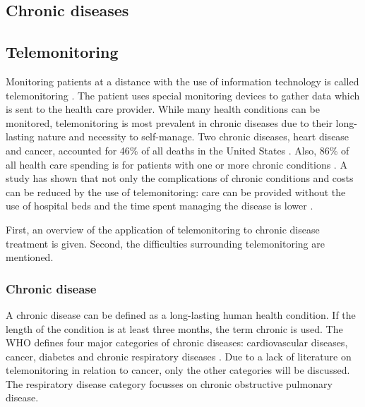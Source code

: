     \subsection{Chronic diseases}


    \subsection{Telemonitoring} \label{2_telemonitoring}
    Monitoring patients at a distance with the use of information technology is called telemonitoring \cite{systematic_review}. The patient uses special monitoring devices to gather data which is sent to the health care provider. While many health conditions can be monitored, telemonitoring is most prevalent in chronic diseases due to their long-lasting nature and necessity to self-manage. Two chronic diseases, heart disease and cancer, accounted for 46\% of all deaths in the United States \cite{national2016health}. Also, 86\% of all health care spending is for patients with one or more chronic conditions \cite{gerteis2014multiple}. A study has shown that not only the complications of chronic conditions and costs can be reduced by the use of telemonitoring: care can be provided without the use of hospital beds and the time spent managing the disease is lower \cite{telemonitoring_current_state}.

    First, an overview of the application of telemonitoring to chronic disease treatment is given. Second, the difficulties surrounding telemonitoring are mentioned.

        \subsubsection{Chronic disease}

        A chronic disease can be defined as a long-lasting human health condition. If the length of the condition is at least three months, the term chronic is used. The WHO defines four major categories of chronic diseases: cardiovascular diseases, cancer, diabetes and chronic respiratory diseases \cite{world2017noncommunicable}. Due to a lack of literature on telemonitoring in relation to cancer, only the other categories will be discussed. The respiratory disease category focusses on chronic obstructive pulmonary disease.

